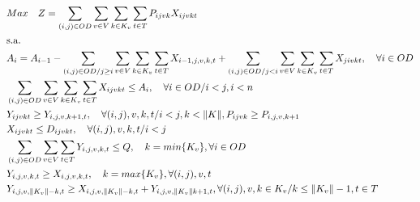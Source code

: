 \begin{align}
	 & Max \quad Z = \sum_{(i,j)\in OD} \sum_{v\in V} \sum_{k\in K_v} \sum_{t\in T} P_{ijvk} X_{ijvkt}                                                                                                                \label{eq: m1_fo}                          \\
	 & \text{s.a.}  \notag                                                                                                                                                                                                                                       \\
	 & A_{i} = A_{i-1} - \sum_{(i,j) \in OD/j \geq i} \sum_{v\in V} \sum_{k\in K_v}\sum_{t\in T}X_{i-1,j,v,k,t} + \sum_{(i,j) \in OD/j<i}\sum_{v\in V} \sum_{k\in K_v}\sum_{t\in T}X_{jivkt}, \quad \forall i \in OD  \label{eq: m1_disponi}                     \\
	 & \sum_{(i,j) \in OD}\sum_{v\in V} \sum_{k\in K_v}\sum_{t\in T} X_{ijvkt} \leq A_{i} , \quad \forall i \in OD /i<j, i < n                                                                                        \label{eq: m1_cap_assig}                   \\
	 & Y_{ijvkt} \geq Y_{i,j,v,k+1,t},  \quad \forall (i,j),v,k,t / i < j, k < \lVert K \rVert,  P_{ijvk} \geq P_{i,j,v,k+1}                                                                                          \label{eq: m1_jerar_class}                 \\
	 & X_{ijvkt} \leq D_{ijvkt},  \quad \forall (i,j),v,k,t/ i < j                                                                                                                                                    \label{eq: m1_assig_menor_dem}             \\
	 & \sum_{(i,j) \in OD}\sum_{v\in V}\sum_{t\in T} Y_{i,j,v,k,t} \leq Q, \quad  k = min\{K_v\}, \forall i \in OD                                                                                                    \label{eq: m1_cap_autho_1er_class}         \\
	 & Y_{i,j,v,k,t} \geq  X_{i,j,v,k,t},  \quad k = max\{K_v\}, \forall(i,j),v,t                                                                                                                                     \label{eq: m1_autho_mayor_assig_1er_class} \\
	 & Y_{i,j,v,\lVert K_v \rVert - k,t} \geq  X_{i,j,v,\lVert K_v \rVert - k,t} + Y_{i,j,v,\lVert K_v \rVert k + 1,t} , \forall(i,j),v, k \in K_v / k \leq \lVert K_v\rVert - 1, t \in T                             \label{eq: m1_autho_mayor_assig_mas_autho} \\

\end{align}
